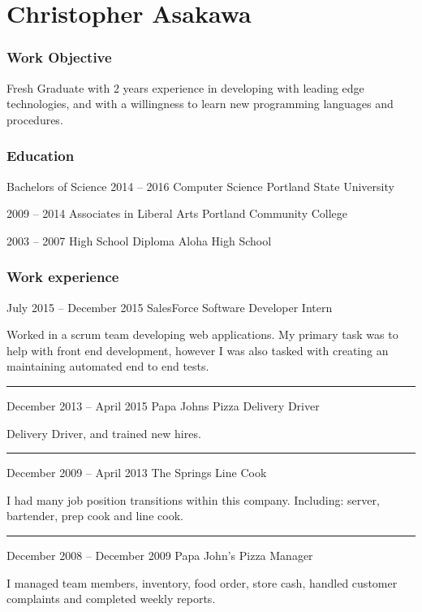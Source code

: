 \documentclass{tccv}
\begin{document}
\part{Christopher Asakawa}

\section{Work Objective}
Fresh Graduate with 2 years experience in developing with leading edge technologies, and with a willingness to learn new programming languages and procedures. 


\section{Education}

\begin{yearlist}

\item[Bachelors of Science]{2014 -- 2016}
     {Computer Science}
     {Portland State University}

\item{2009 -- 2014}
     {Associates in Liberal Arts}
     {Portland Community College}

\item{2003 -- 2007}
     {High School Diploma}
     {Aloha High School}
     
\end{yearlist}


\section{Work experience}

\begin{eventlist}

\item{July 2015 -- December 2015}
     {SalesForce}
     {Software Developer Intern}
     
Worked in a scrum team developing web applications. My primary task was to help with front end development, however I was also tasked with creating an maintaining automated end to end tests.

{\color{light-gray} \noindent\rule{8.7cm}{0.1pt} }
\item{December 2013 -- April 2015}
     {Papa Johns Pizza}
     {Delivery Driver}
     
Delivery Driver, and trained new hires.

{\color{light-gray} \noindent\rule{8.7cm}{0.1pt} }
\item{December 2009 -- April 2013}
     {The Springs}
     {Line Cook}

I had many job position transitions within this company. Including: server, bartender, prep cook and line cook.

{\color{light-gray} \noindent\rule{8.7cm}{0.1pt} }
\item{December 2008 -- December 2009}
     {Papa John's Pizza}
     {Manager}
     
I managed team members, inventory, food order, store cash, handled customer complaints and completed weekly reports.


\end{eventlist}
\end{document}
